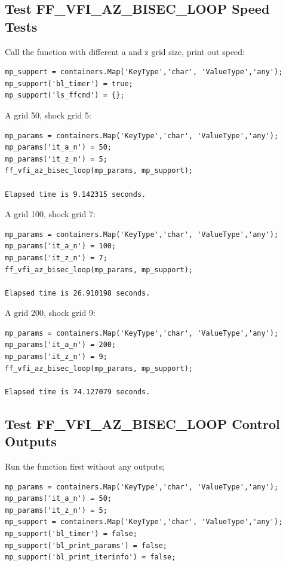 \documentclass[
]{book}
\begin{document}
\hypertarget{test-ff_vfi_az_bisec_loop-speed-tests}{%
\subsection{Test FF\_VFI\_AZ\_BISEC\_LOOP Speed Tests}\label{test-ff_vfi_az_bisec_loop-speed-tests}}

Call the function with different a and z grid size, print out speed:

\begin{verbatim}
mp_support = containers.Map('KeyType','char', 'ValueType','any');
mp_support('bl_timer') = true;
mp_support('ls_ffcmd') = {};
\end{verbatim}

A grid 50, shock grid 5:

\begin{verbatim}
mp_params = containers.Map('KeyType','char', 'ValueType','any');
mp_params('it_a_n') = 50;
mp_params('it_z_n') = 5;
ff_vfi_az_bisec_loop(mp_params, mp_support);

Elapsed time is 9.142315 seconds.
\end{verbatim}

A grid 100, shock grid 7:

\begin{verbatim}
mp_params = containers.Map('KeyType','char', 'ValueType','any');
mp_params('it_a_n') = 100;
mp_params('it_z_n') = 7;
ff_vfi_az_bisec_loop(mp_params, mp_support);

Elapsed time is 26.910198 seconds.
\end{verbatim}

A grid 200, shock grid 9:

\begin{verbatim}
mp_params = containers.Map('KeyType','char', 'ValueType','any');
mp_params('it_a_n') = 200;
mp_params('it_z_n') = 9;
ff_vfi_az_bisec_loop(mp_params, mp_support);

Elapsed time is 74.127079 seconds.
\end{verbatim}

\hypertarget{test-ff_vfi_az_bisec_loop-control-outputs}{%
\subsection{Test FF\_VFI\_AZ\_BISEC\_LOOP Control Outputs}\label{test-ff_vfi_az_bisec_loop-control-outputs}}

Run the function first without any outputs;

\begin{verbatim}
mp_params = containers.Map('KeyType','char', 'ValueType','any');
mp_params('it_a_n') = 50;
mp_params('it_z_n') = 5;
mp_support = containers.Map('KeyType','char', 'ValueType','any');
mp_support('bl_timer') = false;
mp_support('bl_print_params') = false;
mp_support('bl_print_iterinfo') = false;
\end{verbatim}
\end{document}
